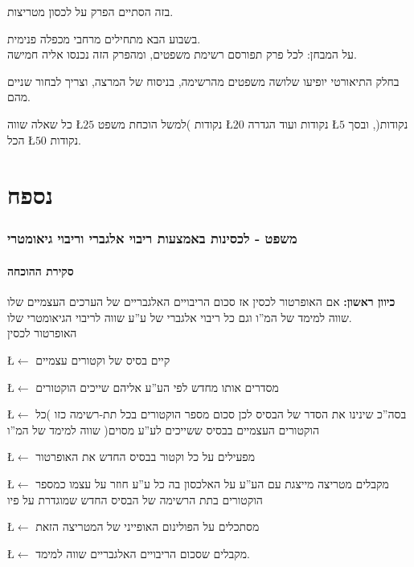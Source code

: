 \documentclass[english,hebrew]{article}
\begin{document}
בזה הסתיים הפרק על לכסון מטריצות.

בשבוע הבא מתחילים מרחבי מכפלה פנימית.\\

על המבחן: לכל פרק תפורסם רשימת משפטים, ומהפרק הזה נכנסו אליה חמישה.

בחלק התיאורטי יופיעו שלושה משפטים מהרשימה, בניסוח של המרצה, וצריך
לבחור שניים מהם.

כל שאלה שווה \L{$25$} נקודות )למשל הוכחת משפט \L{$20$} נקודות ועוד
הגדרה \L{$5$} נקודות(, ובסך הכל \L{$50$} נקודות.

\part{נספח}

\section{משפט - לכסינות באמצעות ריבוי אלגברי וריבוי גיאומטרי}

\subsection{סקירת ההוכחה}

\textbf{כיוון ראשון: }אם האופרטור לכסין אז סכום הריבויים האלגבריים
של הערכים העצמיים שלו שווה למימד של המ\textquotedblright ו וגם כל
ריבוי אלגברי של ע\textquotedblright ע שווה לריבוי הגיאומטרי שלו.\\

האופרטור לכסין

\L{$\leftarrow$} קיים בסיס של וקטורים עצמיים

\L{$\leftarrow$} מסדרים אותו מחדש לפי הע\textquotedblright ע אליהם
שייכים הוקטורים

\L{$\leftarrow$} בסה\textquotedblright כ שינינו את הסדר של הבסיס
לכן סכום מספר הוקטורים בכל תת-רשימה כזו )כל הוקטורים העצמיים בבסיס
ששייכים לע\textquotedblright ע מסוים( שווה למימד של המ\textquotedblright ו 

\L{$\leftarrow$} מפעילים על כל וקטור בבסיס החדש את האופרטור

\L{$\leftarrow$} מקבלים מטריצה מייצגת עם הע\textquotedblright ע על
האלכסון בה כל ע\textquotedblright ע חוזר על עצמו כמספר הוקטורים בתת
הרשימה של הבסיס החדש שמוגדרת על פיו

\L{$\leftarrow$} מסתכלים על הפולינום האופייני של המטריצה הזאת 

\L{$\leftarrow$} מקבלים שסכום הריבויים האלגבריים שווה למימד.
\end{document}
